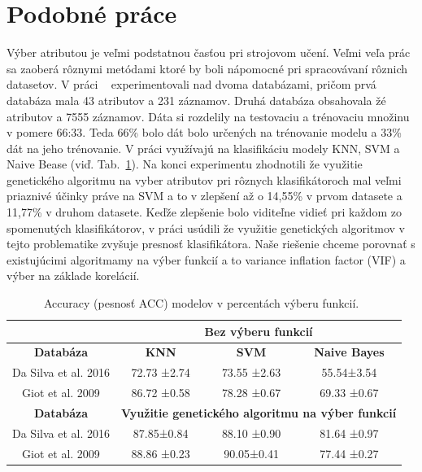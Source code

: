 \documentclass[runningheads]{llncs}
\begin{document}
\section{Podobné práce}

Výber atributou je veľmi podstatnou časťou pri strojovom učení. Veľmi veľa prác sa 
zaoberá rôznymi metódami ktoré by boli nápomocné pri spracovávaní rôznich datasetov.
V práci ~\cite{ref_nascimento} experimentovali nad dvoma databázami, pričom 
prvá databáza mala 43 atributov a 231 záznamov. Druhá databáza obsahovala žé atributov 
a 7555 záznamov. Dáta si rozdelily na testovaciu a trénovaciu množinu v pomere 66:33. 
Teda 66\% bolo dát bolo určených na trénovanie modelu a 33\% dát na jeho trénovanie. 
V práci využívajú na klasifikáciu modely KNN, SVM a Naive Bease (viď. Tab.~\ref{tab_vyber_funkci}). Na konci experimentu zhodnotili 
že využitie genetického algoritmu na vyber atributov pri rôznych klasifikátoroch mal veľmi priaznivé
účinky práve na SVM a to v zlepšení až o 14,55\% v prvom datasete a 11,77\% v druhom datasete.
Keďže zlepšenie bolo viditeľne vidieť pri každom zo spomenutých klasifikátorov, v práci usúdili že
využitie genetických algoritmov v tejto problematike zvyšuje presnosť klasifikátora. Naše riešenie chceme
porovnať s existujúcimi algoritmamy na výber funkcií a to variance inflation factor (VIF) a výber na 
základe korelácií.

\begin{table}[]
\centering
\caption{Accuracy (pesnosť ACC) modelov v percentách výberu funkcií.~\cite{ref_nascimento}}\label{tab_vyber_funkci}
\begin{tabular}{|c|c|c|c|}
\hline
                     & \multicolumn{3}{c|}{\textbf{Bez výberu funkcií}}                     \\ \hline
\textbf{Databáza}    & \textbf{KNN}          & \textbf{SVM}          & \textbf{Naive Bayes} \\ \hline
Da Silva et al. 2016 & 72.73 ±2.74           & 73.55 ±2.63           & 55.54±3.54           \\ \hline
Giot et al. 2009     & 86.72 ±0.58           & 78.28 ±0.67           & 69.33 ±0.67          \\ \hline
\textbf{Databáza}    & \multicolumn{3}{c|}{\textbf{Využitie genetického algoritmu na výber funkcií}} \\ \hline
Da Silva et al. 2016 & 87.85±0.84            & 88.10 ±0.90           & 81.64 ±0.97          \\ \hline
Giot et al. 2009     & 88.86 ±0.23           & 90.05±0.41            & 77.44 ±0.27          \\ \hline
\end{tabular}
\end{table}
\end{document}
